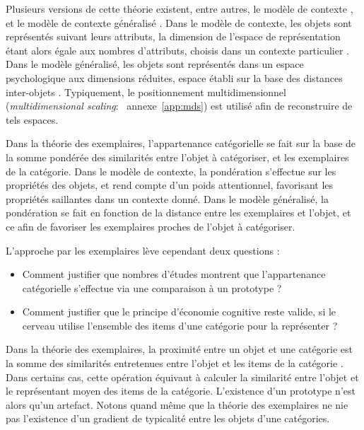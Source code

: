 Plusieurs versions de cette théorie existent, entre autres, le modèle de contexte \citep{medin1978context}, et le modèle de contexte généralisé \citep{nosofsky1986attention}. Dans le modèle de contexte, les objets sont représentés suivant leurs attributs, la dimension de l'espace de représentation étant alors égale aux nombres d'attributs, choisis dans un contexte particulier \citep{hitzman1986schema}. Dans le modèle généralisé, les objets sont représentés dans un espace psychologique aux dimensions réduites, espace établi sur la base des distances inter-objets \citep{nosofsky1992similarity}. Typiquement, le positionnement multidimensionnel (\emph{multidimensional scaling}: \cf~annexe~\ref{app:mds}) est utilisé afin de reconstruire de tels espaces.

Dans la théorie des exemplaires, l'appartenance catégorielle se fait sur la base de la somme pondérée des similarités entre l'objet à catégoriser, et les exemplaires de la catégorie. Dans le modèle de contexte, la pondération s'effectue sur les propriétés des objets, et rend compte d'un poids attentionnel, favorisant les propriétés saillantes dans un contexte donné. Dans le modèle généralisé, la pondération se fait en fonction de la distance entre les exemplaires et l’objet, et ce afin de favoriser les exemplaires proches de l'objet à catégoriser.

L'approche par les exemplaires lève cependant deux questions \citep{goldstone2003concepts}:

\begin{itemize}
\item Comment justifier que nombres d'études montrent que l'appartenance catégorielle s'effectue via une comparaison à un prototype ?
\item Comment justifier que le principe d'économie cognitive reste valide, si le cerveau utilise l'ensemble des items d'une catégorie pour la représenter ? 
\end{itemize}

Dans la théorie des exemplaires, la proximité entre un objet et une catégorie est la somme des similarités entretenues entre l'objet et les items de la catégorie \citep{nosofsky1986attention}. Dans certains cas, cette opération équivaut à calculer la similarité entre l'objet et le représentant moyen des items de la catégorie. L’existence d'un prototype n'est alors qu'un artefact. Notons quand même que la théorie des exemplaires ne nie pas l'existence d'un gradient de typicalité entre les objets d'une catégories.

